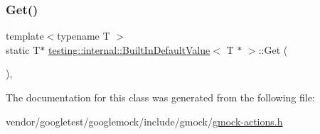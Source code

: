 \mbox{\label{classtesting_1_1internal_1_1_built_in_default_value_3_01_t_01_5_01_4_adc2fa2bdae767589d171ae3a117e3a9f}} 
\subsubsection{\texorpdfstring{Get()}{Get()}}
{\footnotesize\ttfamily template$<$typename T $>$ \\
static T$\ast$ \hyperlink{classtesting_1_1internal_1_1_built_in_default_value}{testing\+::internal\+::\+Built\+In\+Default\+Value}$<$ T $\ast$ $>$\+::Get (\begin{DoxyParamCaption}{ }\end{DoxyParamCaption})\hspace{0.3cm}{\ttfamily [inline]}, {\ttfamily [static]}}



The documentation for this class was generated from the following file\+:\begin{DoxyCompactItemize}
\item 
vendor/googletest/googlemock/include/gmock/\hyperlink{gmock-actions_8h}{gmock-\/actions.\+h}\end{DoxyCompactItemize}
